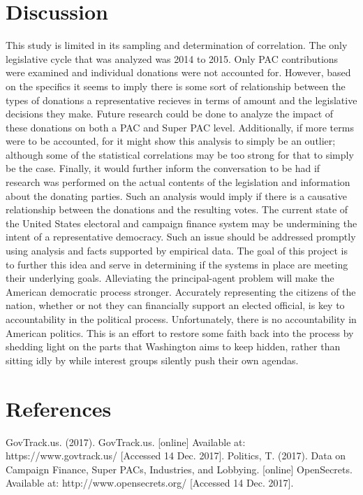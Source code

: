 \documentclass[journal]{IEEEtran}
\begin{document}
\section{Discussion}
This study is limited in its sampling and determination of correlation. The only legislative cycle that was analyzed was 2014 to 2015. Only PAC contributions were
examined and individual donations were not accounted for. However, based on the specifics it seems to imply there is some sort of relationship
between the types of donations a representative recieves in terms of amount and the legislative decisions they make.
Future research could be done to analyze the impact of these donations on both a PAC and Super PAC level. Additionally, if more terms 
were to be accounted, for it might show this analysis to simply be an outlier; although some of the statistical correlations may be too 
strong for that to simply be the case. Finally, it would further inform the conversation to be had if research was performed on the actual 
contents of the legislation and information about the donating parties. Such an analysis would imply if there is a causative 
relationship between the donations and the resulting votes.
The current state of the United States electoral and campaign finance system may be undermining the intent of a representative
democracy. Such an issue should be addressed promptly using analysis and facts supported by empirical data. The goal of this project
is to further this idea and serve in determining if the systems in place are meeting their underlying goals.
Alleviating the principal-agent problem will make the American democratic process stronger. Accurately representing the citizens 
of the nation, whether or not they can financially support an elected official, is key to accountability in the political process. 
Unfortunately, there is no accountability in American politics. This is an effort to restore some faith back into the process by 
shedding light on the parts that Washington aims to keep hidden, rather than sitting idly by while interest groups silently push 
their own agendas.
\section{References}
GovTrack.us. (2017). GovTrack.us. [online] Available at: https://www.govtrack.us/ [Accessed 14 Dec. 2017].
\newline
Politics, T. (2017). Data on Campaign Finance, Super PACs, Industries, and Lobbying. [online] OpenSecrets. Available at: http://www.opensecrets.org/ [Accessed 14 Dec. 2017].
\end{document}
